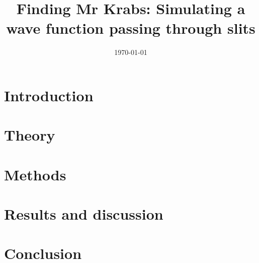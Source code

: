 \documentclass[twocolumn,nofootinbib,nobalancelastpage,10pt]{revtex4-1}
\begin{document}
\title{Finding Mr Krabs: Simulating a wave function passing through slits}

\author{}

\affiliation{}

\begin{abstract}
\end{abstract}

\date{\today}

\maketitle

\section{Introduction}

\section{Theory}

\section{Methods}

\section{Results and discussion}

\section{Conclusion}




\end{document}
